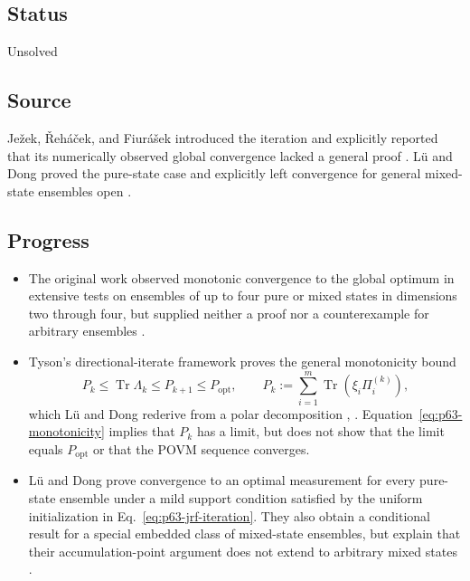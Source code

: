 \subsection*{Status}

Unsolved

\subsection*{Source}

Je\v{z}ek, \v{R}eh\'{a}\v{c}ek, and Fiur\'{a}\v{s}ek introduced the
iteration and explicitly reported that its numerically observed global
convergence lacked a general proof
.  L\"u and Dong proved
the pure-state case and explicitly left convergence for general mixed-state
ensembles open .

\subsection*{Progress}

\begin{itemize}
  \item The original work observed monotonic convergence to the global optimum
  in extensive tests on ensembles of up to four pure or mixed states in
  dimensions two through four, but supplied neither a proof nor a
  counterexample for arbitrary ensembles
  .

  \item Tyson's directional-iterate framework proves the general monotonicity
  bound
  \begin{equation}
    P_k\leq\operatorname{Tr}\Lambda_k
        \leq P_{k+1}\leq P_{\mathrm{opt}},
    \qquad
    P_k:=\sum_{i=1}^{m}\operatorname{Tr}(\xi_i\Pi_i^{(k)}),
    \label{eq:p63-monotonicity}
  \end{equation}
  which L\"u and Dong rederive from a polar decomposition
  ,
  .  Equation~\eqref{eq:p63-monotonicity}
  implies that $P_k$ has a limit, but does not show that the limit equals
  $P_{\mathrm{opt}}$ or that the POVM sequence converges.

  \item L\"u and Dong prove convergence to an optimal measurement for every
  pure-state ensemble under a mild support condition satisfied by the uniform
  initialization in Eq.~\eqref{eq:p63-jrf-iteration}.  They also obtain a
  conditional result for a special embedded class of mixed-state ensembles,
  but explain that their accumulation-point argument does not extend to
  arbitrary mixed states .
\end{itemize}

